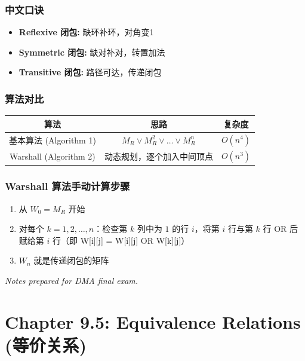 \documentclass[10pt,a4paper,openany]{ctexbook}
\theoremstyle{definition}
\theoremstyle{remark}
\begin{document}
\subsubsection{中文口诀}

\begin{itemize}
\item \textbf{Reflexive 闭包:} 缺环补环，对角变1
\item \textbf{Symmetric 闭包:} 缺对补对，转置加法
\item \textbf{Transitive 闭包:} 路径可达，传递闭包

\end{itemize}

\subsubsection{算法对比}

\begin{center}
\begin{tabular}{ccc}
\hline
算法 & 思路 & 复杂度 \\ \hline
基本算法 (Algorithm 1) & $M_R \lor M_R^2 \lor \dots \lor M_R^n$ & $O(n^4)$ \\
Warshall (Algorithm 2) & 动态规划，逐个加入中间顶点 & $O(n^3)$ \\
\hline
\end{tabular}

\end{center}

\subsubsection{Warshall 算法手动计算步骤}

\begin{enumerate}
\item 从 $W_0 = M_R$ 开始
\item 对每个 $k = 1, 2, \dots, n$：检查第 $k$ 列中为 $1$ 的行 $i$，将第 $i$ 行与第 $k$ 行 OR 后赋给第 $i$ 行（即 W[i][j] = W[i][j] OR W[k][j]）
\item $W_n$ 就是传递闭包的矩阵

\end{enumerate}

\vspace{-2pt}

\textit{Notes prepared for DMA final exam.}


\section{Chapter 9.5: Equivalence Relations (等价关系)}
\end{document}
